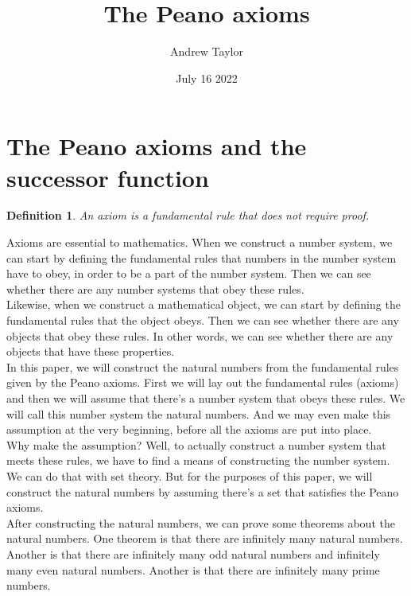 \documentclass{article}
\title{The Peano axioms}
\author{Andrew Taylor}
\date{July 16 2022}
\newtheorem{definition}{Definition}
\begin{document}
\maketitle

\section{The Peano axioms and the successor function}

\begin{definition}
An axiom is a fundamental rule that does not require proof.
\end{definition}

Axioms are essential to mathematics. When we construct a number system, we can start by defining the fundamental rules that numbers in the number system have to obey, in order to be a part of the number system. Then we can see whether there are any number systems that obey these rules. \\

Likewise, when we construct a mathematical object, we can start by defining the fundamental rules that the object obeys. Then we can see whether there are any objects that obey these rules. In other words, we can see whether there are any objects that have these properties. \\

In this paper, we will construct the natural numbers from the fundamental rules given by the Peano axioms. First we will lay out the fundamental rules (axioms) and then we will assume that there's a number system that obeys these rules. We will call this number system the natural numbers. And we may even make this assumption at the very beginning, before all the axioms are put into place. \\

Why make the assumption? Well, to actually construct a number system that meets these rules, we have to find a means of constructing the number system. We can do that with set theory. But for the purposes of this paper, we will construct the natural numbers by assuming there's a set that satisfies the Peano axioms. \\

After constructing the natural numbers, we can prove some theorems about the natural numbers. One theorem is that there are infinitely many natural numbers. Another is that there are infinitely many odd natural numbers and infinitely many even natural numbers. Another is that there are infinitely many prime numbers.
\end{document}
